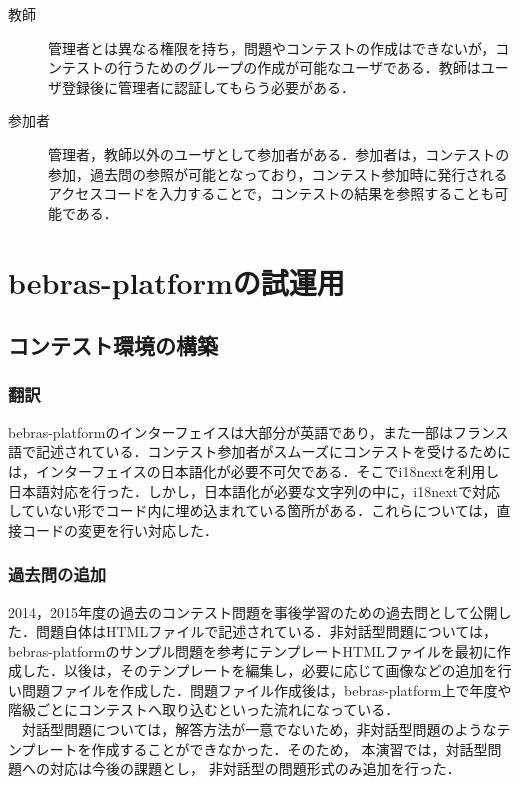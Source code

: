 \documentclass[a4paper]{jarticle}
\begin{document}
\begin{multicols}{2}
\begin{description}
\item[教師] 管理者とは異なる権限を持ち，問題やコンテストの作成はできないが，コンテストの行うためのグループの作成が可能なユーザである．教師はユーザ登録後に管理者に認証してもらう必要がある．
\end{description}

\begin{description}
\item[参加者] 管理者，教師以外のユーザとして参加者がある．参加者は，コンテストの参加，過去問の参照が可能となっており，コンテスト参加時に発行されるアクセスコードを入力することで，コンテストの結果を参照することも可能である．
\end{description}




\section{bebras-platformの試運用}
\subsection{コンテスト環境の構築}
\subsubsection{翻訳}
bebras-platformのインターフェイスは大部分が英語であり，また一部はフランス語で記述されている．コンテスト参加者がスムーズにコンテストを受けるためには，インターフェイスの日本語化が必要不可欠である．そこでi18nextを利用し日本語対応を行った．しかし，日本語化が必要な文字列の中に，i18nextで対応していない形でコード内に埋め込まれている箇所がある．これらについては，直接コードの変更を行い対応した．

\subsubsection{過去問の追加}
2014，2015年度の過去のコンテスト問題を事後学習のための過去問として公開した．問題自体はHTMLファイルで記述されている．非対話型問題については，bebras-platformのサンプル問題を参考にテンプレートHTMLファイルを最初に作成した．以後は，そのテンプレートを編集し，必要に応じて画像などの追加を行い問題ファイルを作成した．問題ファイル作成後は，bebras-platform上で年度や階級ごとにコンテストへ取り込むといった流れになっている．
\\　対話型問題については，解答方法が一意でないため，非対話型問題のようなテンプレートを作成することができなかった．そのため，
本演習では，対話型問題への対応は今後の課題とし，
非対話型の問題形式のみ追加を行った．


\end{multicols}
\end{document}
